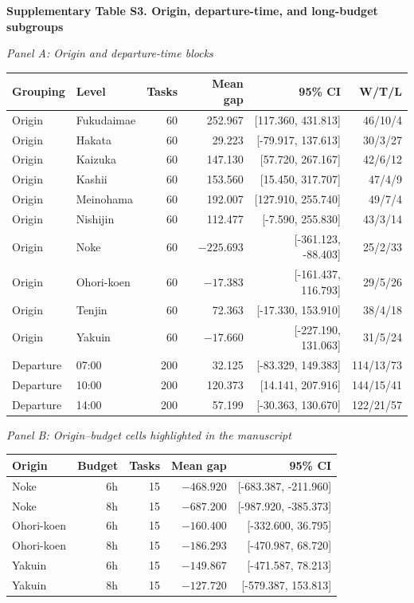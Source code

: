 \documentclass[10pt,a4paper]{article}
\newcommand{\ci}[2]{[#1, #2]}
\newcommand{\suppheading}[2]{%
  \par\needspace{7\baselineskip}\vspace{8pt}%
  {\large\bfseries Supplementary #1. #2}\par\vspace{5pt}}
\newcommand{\panel}[1]{\par\vspace{5pt}\textit{#1}\par\smallskip}
\begin{document}
\suppheading{Table S3}{Origin, departure-time, and long-budget subgroups}

\begin{center}
\small
\panel{Panel A: Origin and departure-time blocks}
\begin{tabular}{@{}llrrrr@{}}
\toprule
Grouping & Level & Tasks & Mean gap & 95\% CI & W/T/L \\
\midrule
Origin & Fukudaimae & 60 & 252.967 & \ci{117.360}{431.813} & 46/10/4 \\
Origin & Hakata & 60 & 29.223 & \ci{-79.917}{137.613} & 30/3/27 \\
Origin & Kaizuka & 60 & 147.130 & \ci{57.720}{267.167} & 42/6/12 \\
Origin & Kashii & 60 & 153.560 & \ci{15.450}{317.707} & 47/4/9 \\
Origin & Meinohama & 60 & 192.007 & \ci{127.910}{255.740} & 49/7/4 \\
Origin & Nishijin & 60 & 112.477 & \ci{-7.590}{255.830} & 43/3/14 \\
Origin & Noke & 60 & $-225.693$ & \ci{-361.123}{-88.403} & 25/2/33 \\
Origin & Ohori-koen & 60 & $-17.383$ & \ci{-161.437}{116.793} & 29/5/26 \\
Origin & Tenjin & 60 & 72.363 & \ci{-17.330}{153.910} & 38/4/18 \\
Origin & Yakuin & 60 & $-17.660$ & \ci{-227.190}{131.063} & 31/5/24 \\
Departure & 07:00 & 200 & 32.125 & \ci{-83.329}{149.383} & 114/13/73 \\
Departure & 10:00 & 200 & 120.373 & \ci{14.141}{207.916} & 144/15/41 \\
Departure & 14:00 & 200 & 57.199 & \ci{-30.363}{130.670} & 122/21/57 \\
\bottomrule
\end{tabular}

\panel{Panel B: Origin--budget cells highlighted in the manuscript}
\begin{tabular}{@{}lrrrr@{}}
\toprule
Origin & Budget & Tasks & Mean gap & 95\% CI \\
\midrule
Noke & 6h & 15 & $-468.920$ & \ci{-683.387}{-211.960} \\
Noke & 8h & 15 & $-687.200$ & \ci{-987.920}{-385.373} \\
Ohori-koen & 6h & 15 & $-160.400$ & \ci{-332.600}{36.795} \\
Ohori-koen & 8h & 15 & $-186.293$ & \ci{-470.987}{68.720} \\
Yakuin & 6h & 15 & $-149.867$ & \ci{-471.587}{78.213} \\
Yakuin & 8h & 15 & $-127.720$ & \ci{-579.387}{153.813} \\
\bottomrule
\end{tabular}
\end{center}
\end{document}
